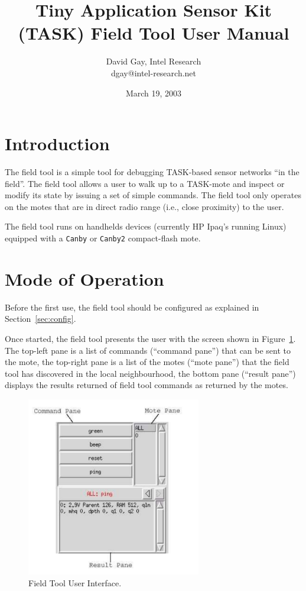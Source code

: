 \documentclass{article}
\begin{document}
\parindent 0cm
\parskip 0.3cm

\title{Tiny Application Sensor Kit (TASK) Field Tool User Manual}
\author{David Gay, Intel Research \\
dgay@intel-research.net}
\date{March 19, 2003}
\maketitle

\section{Introduction}

The field tool is a simple tool for debugging TASK-based sensor networks
``in the field''. The field tool allows a user to walk up to a TASK-mote and
inspect or modify its state by issuing a set of simple commands. The field
tool only operates on the motes that are in direct radio range (i.e., close
proximity) to the user.

The field tool runs on handhelds devices (currently HP Ipaq's running Linux)
equipped with a {\tt Canby} or {\tt Canby2} compact-flash mote.

\section{Mode of Operation}

Before the first use, the field tool should be configured as explained
in Section~\ref{sec:config}.

Once started, the field tool presents the user with the screen shown in
Figure~\ref{fig:toolview}. The top-left pane is a list of commands
(``command pane'') that can be sent to the mote, the top-right pane is a
list of the motes (``mote pane'') that the field tool has discovered in the
local neighbourhood, the bottom pane (``result pane'') displays the results
returned of field tool commands as returned by the motes.

\begin{figure}[t]
\begin{center}
\includegraphics[width=3in]{./fig/fieldtool-gui.pdf}
\end{center}
\caption{Field Tool User Interface.}
\label{fig:toolview}
\end{figure}
\end{document}
